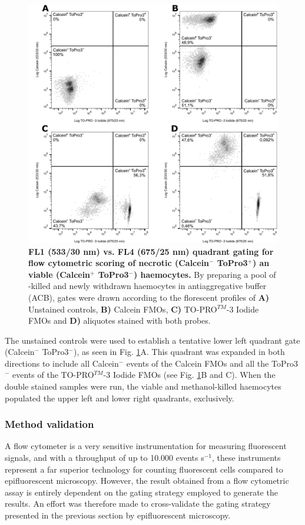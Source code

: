 \begin{figure}[h]
    \centering
    \includegraphics[width=.7\textwidth]{figures/Gating strategy/TP3 Calcein gating strategy 2.pdf}
    \caption{\textbf{FL1 (533/30 nm) vs. FL4 (675/25 nm) quadrant gating for flow cytometric scoring of necrotic (Calcein$^{-}$ ToPro3$^{+}$) an viable (Calcein$^{+}$ ToPro3$^{-}$) haemocytes.} By preparing a pool of -killed and newly withdrawn haemocytes in antiaggregative buffer (ACB), gates were drawn according to the florescent profiles of \textbf{A)} Unstained controls, \textbf{B)} Calcein FMOs, \textbf{C)} TO-PRO$^{TM}$-3 Iodide FMOs and \textbf{D)} aliquotes stained with both probes.}
    \label{fig:TP3_Calcein_gating_strat}
\end{figure}

The unstained controls were used to establish a tentative lower left quadrant gate (Calcein$^{-}$ ToPro3$^{-}$), as seen in Fig. \ref{fig:TP3_Calcein_gating_strat}A. This quadrant was expanded in both directions to include all Calcein$^{-}$ events of the Calcein FMOs and all the ToPro3$^{-}$ events of the TO-PRO$^{TM}$-3 Iodide FMOs (see Fig. \ref{fig:TP3_Calcein_gating_strat}B and C). When the double stained samples were run, the viable and methanol-killed haemocytes populated the upper left and lower right quadrants, exclusively.

\subsubsection{Method validation}
A flow cytometer is a very sensitive instrumentation for measuring fluorescent signals, and with a throughput of up to 10.000 events s$^{-1}$, these instruments represent a far superior technology for counting fluorescent cells compared to epifluorescent microscopy. However, the result obtained from a flow cytometric assay is entirely dependent on the gating strategy employed to generate the results. An effort was therefore made to cross-validate the gating strategy presented in the previous section by epifluorescent microscopy.

